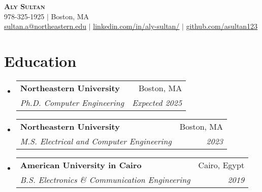\documentclass[letterpaper,11pt]{article}
\makeatletter
\newcommand{\resumeSubheading}[4]{
  \vspace{-2pt}\item
    \begin{tabular*}{0.97\textwidth}[t]{l@{\extracolsep{\fill}}r}
      \textbf{#1} & #2 \\
      \textit{\small#3} & \textit{\small #4} \\
    \end{tabular*}\vspace{-7pt}
}
\newcommand{\resumeSubHeadingListStart}{\begin{itemize}[leftmargin=0.15in, label={}]}
\newcommand{\resumeSubHeadingListEnd}{\end{itemize}}
\makeatother
\begin{document}

\begin{center}
    \textbf{\Huge \scshape Aly Sultan} \\ \vspace{2pt}
    \small 978-325-1925 $|$ \small Boston, MA \\ \vspace{2pt}
    \href{mailto:sultan.a@northeastern.edu}{\underline{sultan.a@northeastern.edu}} $|$ 
    \href{https://linkedin.com/in/aly-sultan/}{\underline{linkedin.com/in/aly-sultan/}} $|$
    \href{https://github.com/asultan123}{\underline{github.com/asultan123}}
    
\end{center}


\section{Education}
  \resumeSubHeadingListStart
    \resumeSubheading
      {Northeastern University}{Boston, MA}
      {Ph.D. Computer Engineering}{Expected 2025}
    \resumeSubheading
      {Northeastern University}{Boston, MA}
      {M.S. Electrical and Computer Engineering}{2023}
    \resumeSubheading
      {American University in Cairo}{Cairo, Egypt}
      {B.S. Electronics \& Communication Engineering}{2019}
  \resumeSubHeadingListEnd


\end{document}
